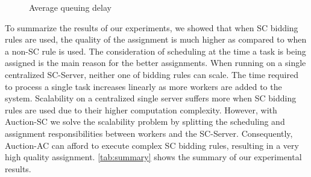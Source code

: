 \begin{figure}[h]
    \centering
    \vspace{-0.15in}
    \caption{Average queuing delay}
    \label{fig:queue}
\end{figure}

To summarize the results of our experiments, we showed that when SC bidding rules are used, the quality of the assignment is much higher as compared to when a non-SC rule is used. The consideration of scheduling at the time a task is being assigned is the main reason for the better assignments. When running on a single centralized SC-Server, neither one of bidding rules can scale. The time required to process a single task increases linearly as more workers are added to the system. Scalability on a centralized single server suffers more when SC bidding rules are used due to their higher computation complexity. However, with Auction-SC we solve the scalability problem by splitting the scheduling and assignment responsibilities between workers and the SC-Server. Consequently, Auction-AC can afford to execute complex SC bidding rules, resulting in a very high quality assignment. \cref{tab:summary} shows the summary of our experimental results.

